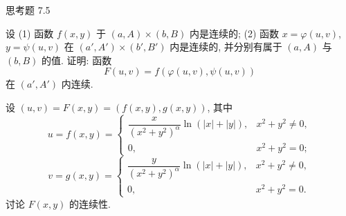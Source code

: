 \begin{exblock}{思考题 7.5}
  \item 设 (1) 函数 $f(x, y)$ 于 $(a, A) \times (b, B)$ 内是连续的; (2) 函数 $x = \varphi(u, v)$, $y = \psi(u, v)$ 在 $(a', A') \times (b', B')$ 内是连续的, 并分别有属于 $(a, A)$ 与 $(b, B)$ 的值. 证明: 函数
  \[
    F(u, v) = f(\varphi(u, v), \psi(u, v))
  \]
  在 $(a', A')$ 内连续.

  \item 设 $(u, v) = F(x, y) = (f(x, y), g(x, y))$, 其中
  \[
    u = f(x, y) =
    \begin{cases}
      \dfrac{x}{(x^{2} + y^{2})^{\alpha}}\ln(|x| + |y|), & x^{2} + y^{2} \neq 0, \\[2.5mm]
      0, & x^{2} + y^{2} = 0;
    \end{cases}
  \]
  \[
    v = g(x, y) =
    \begin{cases}
      \dfrac{y}{(x^{2} + y^{2})^{\alpha}}\ln(|x| + |y|), & x^{2} + y^{2} \neq 0, \\[2.5mm]
      0, & x^{2} + y^{2} = 0.
    \end{cases}
  \]
  讨论 $F(x, y)$ 的连续性.
\end{exblock}
